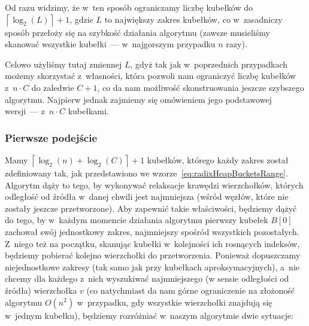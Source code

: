 Od razu widzimy, że w~ten sposób ograniczamy liczbę kubełków do $\left \lceil \log_{2} \left( L \right) \right \rceil + 1$, gdzie $L$ to największy zakres kubełków, co w~zasadniczy sposób przełoży się na szybkość działania algorytmu (zawsze musieliśmy skanować wszystkie kubełki~--- w~najgorszym przypadku $n$ razy).

Celowo użyliśmy tutaj zmiennej $L$, gdyż tak jak w~poprzednich przypadkach możemy skorzystać z~własności, która pozwoli nam ograniczyć liczbę kubełków z~$n \cdot C$ do zaledwie $C + 1$, co da nam możliwość skonstruowania jeszcze szybszego algorytmu.
Najpierw jednak zajmiemy się omówieniem jego podstawowej wersji~--- z~$n \cdot C$ kubełkami.


\subsubsection{Pierwsze podejście}


Mamy $\left \lceil \log_{2} \left( n \right) + \log_{2} \left( C \right) \right \rceil + 1$ kubełków, którego każdy zakres został zdefiniowany tak, jak przedstawiono we wzorze~\ref{eq:radixHeapBucketsRange}.
Algorytm dąży to tego, by wykonywać relaksacje krawędzi wierzchołków, których odległość od źródła w~danej chwili jest najmniejsza (wśród węzłów, które nie zostały jeszcze przetworzone).
Aby zapewnić takie właściwości, będziemy dążyć do tego, by w~każdym momencie działania algorytmu pierwszy kubełek $B \left[ 0 \right]$ zachował swój jednostkowy zakres, najmniejszy spośród wszystkich pozostałych.
Z~niego też na początku, skanując kubełki w~kolejności ich rosnących indeksów, będziemy pobierać kolejno wierzchołki do przetworzenia.
Ponieważ dopuszczamy niejednostkowe zakresy (tak samo jak przy kubełkach aproksymacyjnych), a~nie chcemy dla każdego z~nich wyszukiwać najmniejszego (w sensie odległości od źródła) wierzchołka $v$ (co natychmiast da nam górne ograniczenie na złożoność algorytmu $O \left( n ^{2} \right)$ w~przypadku, gdy wszystkie wierzchołki znajdują się w~jednym kubełku), będziemy rozróżniać w~naszym algorytmie dwie sytuacje:

